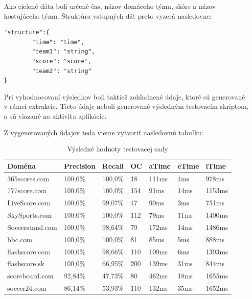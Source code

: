 \bigskip

Ako cielené dáta boli určené čas, názov domáceho týmu, skóre a názov hosťujúceho týmu. Štruktúra vstupných dát preto vyzerá nasledovne:

\bigskip

\begin{lstlisting}
"structure":{
        "time": "time",
        "team1": "string",
        "score": "score",
        "team2": "string"
}
\end{lstlisting}

\bigskip

Pri vyhodnocovaní výsledkov boli taktiež zohľadnené údaje, ktoré sú generované v rámci extrakcie. Tieto údaje neboli generované výsledným testovacím skriptom, a sú viazané na aktivitu aplikácie.

\newpage



Z vygenerovaných údajov teda vieme vytvoriť nasledovnú tabuľku:

\begin{table}[hbt]
\caption{Výsledné hodnoty testovacej sady}
\centering
\begin{tabular}{|l|l|l|l|l|l|l|}
\hline
Doména          & Precision & Recall  & OC & aTime & eTime & lTime  \\ \hline
365scores.com   & 100,0\%   & 100,0\% & 18       & 111ms & 4ms   & 978ms  \\ \hline
777score.com    & 100,0\%   & 100,0\% & 154      & 91ms  & 14ms  & 1153ms \\ \hline
LiveScore.com   & 100,0\%   & 99,07\% & 47       & 90ms  & 3ms   & 751ms  \\ \hline
SkySports.com   & 100,0\%   & 100,0\% & 112      & 79ms  & 11ms  & 1400ms \\ \hline
Soccerstand.com & 100,0\%   & 98,64\% & 79       & 172ms & 14ms  & 1486ms \\ \hline
bbc.com         & 100,0\%   & 100,0\% & 81       & 85ms  & 5ms   & 888ms  \\ \hline
flashscore.com  & 100,0\%   & 98,66\% & 110      & 109ms & 6ms   & 1393ms \\ \hline
flashscore.sk   & 100,0\%   & 66,95\% & 200      & 139ms & 31ms  & 844ms  \\ \hline
scoreboard.com  & 92,84\%   & 47,73\% & 80       & 462ms & 18ms  & 1655ms \\ \hline
soccer24.com    & 86,14\%   & 53,93\% & 110      & 132ms & 35ms  & 1652ms \\ \hline
\end{tabular}
\end{table}

